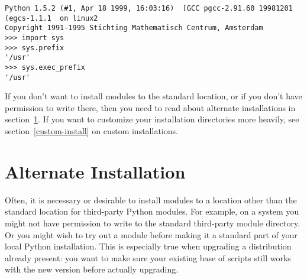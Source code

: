 \documentclass{howto}
\begin{document}
\begin{verbatim}
Python 1.5.2 (#1, Apr 18 1999, 16:03:16)  [GCC pgcc-2.91.60 19981201 (egcs-1.1.1  on linux2
Copyright 1991-1995 Stichting Mathematisch Centrum, Amsterdam
>>> import sys
>>> sys.prefix
'/usr'
>>> sys.exec_prefix
'/usr'
\end{verbatim}

If you don't want to install modules to the standard location, or if you
don't have permission to write there, then you need to read about
alternate installations in section~\ref{alt-install}.  If you want to
customize your installation directories more heavily, see
section~\ref{custom-install} on custom installations.



\newcommand{\installscheme}[8]
  {\begin{tableiii}{lll}{textrm}
          {Type of file}
          {Installation Directory}
          {Override option}
     \lineiii{pure module distribution}
             {\filevar{#1}\filenq{#2}}
             {\longprogramopt{install-purelib}}
     \lineiii{non-pure module distribution}
             {\filevar{#3}\filenq{#4}}
             {\longprogramopt{install-platlib}}
     \lineiii{scripts}
             {\filevar{#5}\filenq{#6}}
             {\longprogramopt{install-scripts}}
     \lineiii{data}
             {\filevar{#7}\filenq{#8}}
             {\longprogramopt{install-data}}
   \end{tableiii}}


\section{Alternate Installation}
\label{alt-install}

Often, it is necessary or desirable to install modules to a location
other than the standard location for third-party Python modules.  For
example, on a \UNIX{} system you might not have permission to write to the
standard third-party module directory.  Or you might wish to try out a
module before making it a standard part of your local Python
installation.  This is especially true when upgrading a distribution
already present: you want to make sure your existing base of scripts
still works with the new version before actually upgrading.
\end{document}
